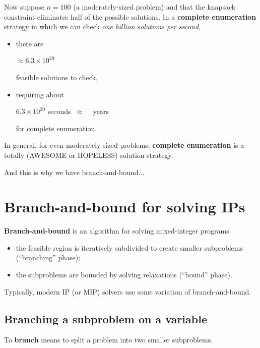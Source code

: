\documentclass[11pt]{article}
\theoremstyle{definition}
\newcommand{\answerbox}[3]{%
  \fbox{%
    \begin{minipage}[#1]{#2}
      \hfill\vspace{#3}
    \end{minipage}
  }
}
\newcommand{\wordbox}{\answerbox{c}{1.2in}{.7cm}}
\newcommand{\catbox}{\answerbox{c}{.5in}{.7cm}}
\begin{document}
Now suppose $n = 100$ (a moderately-sized problem) and that the knapsack constraint eliminates half of the possible solutions.  In a \textbf{complete enumeration} strategy in which we can check \emph{one billion solutions per second},

\begin{itemize}
\item there are 
\begin{center}
\catbox $\approx 6.3 \times 10^{29}$
\end{center}
feasible solutions to check,
\item requiring about 

\begin{center}
$6.3 \times 10^{20}$ seconds $~\approx~~$ \wordbox ~years
\end{center}
for complete enumeration.
\end{itemize}

\begin{tcolorbox}
In general, for even moderately-sized problems, \textbf{complete enumeration} is a totally (AWESOME or HOPELESS) solution strategy.
\end{tcolorbox}

And this is why we have branch-and-bound...

\vfill 
\section{Branch-and-bound for solving IPs}

\begin{tcolorbox}
\textbf{Branch-and-bound} is an algorithm for solving mixed-integer programs: 
\begin{itemize}
\item the feasible region is iteratively subdivided to create smaller subproblems  (``branching'' phase);
\item the subproblems are bounded by solving relaxations  (``bound'' phase).
\end{itemize}
\end{tcolorbox}

Typically, modern IP (or MIP) solvers use some variation of branch-and-bound.
\vfill
\newpage
\subsection{Branching a subproblem on a variable}

To \textbf{branch} means to split a problem into two smaller subproblems. 
\end{document}
